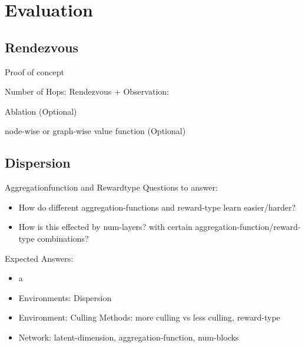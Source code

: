 
\chapter{Evaluation}
\label{ch:Evaluation}



\section{Rendezvous}
Proof of concept\par

Number of Hops: Rendezvous + Observation:
\par

Ablation (Optional)
\par

node-wise or graph-wise value function (Optional)



\section{Dispersion}
Aggregationfunction and Rewardtype
Questions to answer:
\begin{itemize}[noitemsep,nolistsep]
    \item How do different aggregation-functions and reward-type learn easier/harder?
    \item How is this effected by num-layers? with certain aggregation-function/reward-type combinations?
\end{itemize}
Expected Answers:
\begin{itemize}[noitemsep,nolistsep]
    \item a
\end{itemize}
\begin{itemize}[noitemsep,nolistsep]
    \item Environments: Dispersion
    \item Environment: Culling Methods: more culling vs less culling, reward-type
    \item Network: latent-dimension, aggregation-function, num-blocks
\end{itemize}


